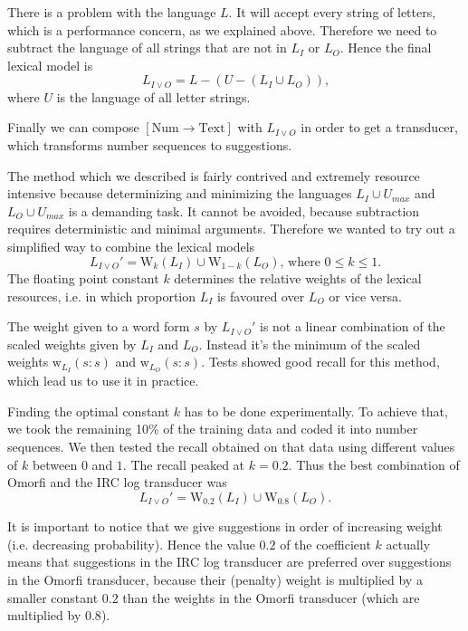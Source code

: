 \documentclass[a4paper,conference]{IEEEtran}
\begin{document}
There is a problem with the language $L$. It will accept every
string of letters, which is a performance concern, as we explained
above. Therefore we need to subtract the language of all strings that
are not in $L_I$ or $L_O$. Hence the final lexical model is
\begin{equation}L_{I\vee O} = L - (U - (L_I \cup L_O))\text{,}\end{equation}
where $U$ is the language of all letter strings.

Finally we can compose $[\mathrm{Num}\rightarrow\mathrm{Text}]$ with
$L_{I\vee O}$ in order to get a transducer, which transforms number
sequences to suggestions.

The method which we described is fairly contrived and extremely
resource intensive because determinizing and minimizing the languages
$L_I \cup U_{max}$ and $L_O \cup U_{max}$ is a demanding task. It
cannot be avoided, because subtraction requires deterministic and
minimal arguments. Therefore we wanted to try out a simplified way to
combine the lexical models
\begin{equation}
  L_{I\vee O}' = \mathrm{W}_k(L_I) \cup \mathrm{W}_{1-k}(L_O)\text{, where }0 \leq k \leq 1\text{.}
\end{equation} 
The floating point constant $k$ determines the relative weights of the lexical resources, i.e. in which proportion $L_I$ is favoured over $L_O$ or vice versa.

The weight given to a word form $s$ by $L_{I\vee O}'$ is not a linear
combination of the scaled weights given by $L_I$ and $L_O$. Instead
it's the minimum of the scaled weights
$\mathrm{w}_{L_I}(s\mathrm{:}s)$ and $\mathrm{w}_{L_O}(s\mathrm{:}s)$.
Tests showed good recall for this method, which lead us to use it in
practice.

Finding the optimal constant $k$ has to be done experimentally. To achieve that, we took the remaining 10\% of the training data and coded it into number sequences. We then tested the recall
obtained on that data using different values of $k$ between $0$ and $1$. The recall peaked at $k = 0.2$. Thus the best combination of Omorfi and the IRC log transducer was
\begin{equation}L_{I\vee O}' = \mathrm{W}_{0.2}(L_I) \cup \mathrm{W}_{0.8}(L_O)\text{.}\end{equation}

It is important to notice that we give suggestions in order of
increasing weight (i.e. decreasing probability). Hence the value $0.2$
of the coefficient $k$ actually means that suggestions in the IRC log
transducer are preferred over suggestions in the Omorfi transducer,
because their (penalty) weight is multiplied by a smaller constant $0.2$ than
the weights in the Omorfi transducer (which are multiplied by $0.8$).
\end{document}
